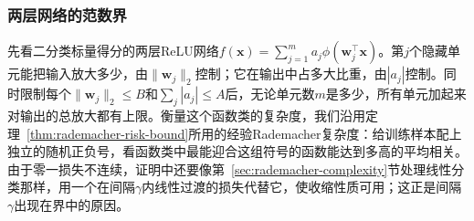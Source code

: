 \subsubsection{两层网络的范数界}

先看二分类标量得分的两层ReLU网络$f(\bm x)=\sum_{j=1}^m a_j\phi(\bm w_j^\top\bm x)$。第$j$个隐藏单元能把输入放大多少，由$\|\bm w_j\|_2$控制；它在输出中占多大比重，由$|a_j|$控制。同时限制每个$\|\bm w_j\|_2\leq B$和$\sum_j|a_j|\leq A$后，无论单元数$m$是多少，所有单元加起来对输出的总放大都有上限。衡量这个函数类的复杂度，我们沿用定理~\ref{thm:rademacher-risk-bound}所用的经验Rademacher复杂度：给训练样本配上独立的随机正负号，看函数类中最能迎合这组符号的函数能达到多高的平均相关。由于零一损失不连续，证明中还要像第~\ref{sec:rademacher-complexity}节处理线性分类那样，用一个在间隔$\gamma$内线性过渡的损失代替它，使收缩性质可用；这正是间隔$\gamma$出现在界中的原因。


